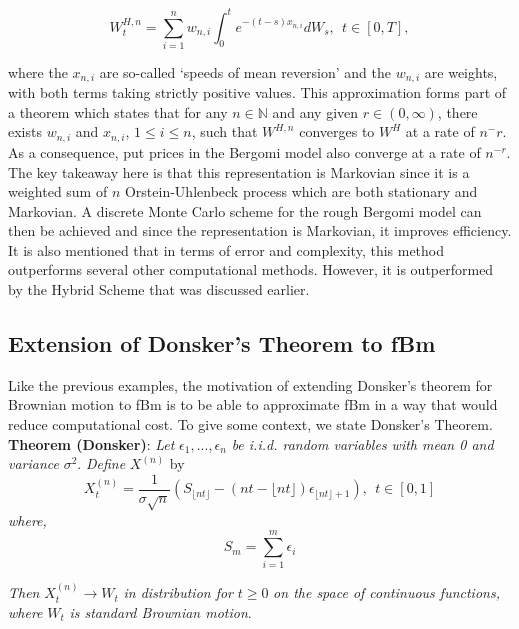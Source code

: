\documentclass[12pt,oneside]{article}
\begin{document}
\begin{equation}
\label{eqn:markov_approx}
W_t^{H,n} = \sum_{i=1}^n w_{n,i} \int_0^t e^{-(t-s)x_{n,i}}dW_s, \ \ t \in [0,T], 
\end{equation}

where the $x_{n,i}$ are so-called `speeds of mean reversion' and the $w_{n,i}$ are weights, with both terms taking strictly positive values. This approximation forms part of a theorem which states that for any $n\in\mathbb{N}$ and any given $r\in(0, \infty)$, there exists $w_{n,i}$ and $x_{n,i}$, $1\le i\le n$, such that $W^{H,n}$ converges to $W^H$ at a rate of $n^-{r}$. As a consequence, put prices in the Bergomi model also converge at a rate of $n^{-r}$. 
\\

The key takeaway here is that this representation is Markovian since it is a weighted sum of $n$ Orstein-Uhlenbeck process which are both stationary and Markovian. A discrete Monte Carlo scheme for the rough Bergomi model can then be achieved and since the representation is Markovian, it improves efficiency. It is also mentioned that in terms of error and complexity, this method outperforms several other computational methods. However, it is outperformed by the Hybrid Scheme that was discussed earlier. 

\subsection{Extension of Donsker's Theorem to fBm}
Like the previous examples, the motivation of extending Donsker's theorem for Brownian motion to fBm is to be able to approximate fBm in a way that would reduce computational cost. To give some context, we state Donsker's Theorem.
\\

 \noindent\textbf{Theorem (Donsker)}: \emph{Let} $\epsilon_1,...,\epsilon_n$ \emph{be i.i.d. random variables with mean 0 and variance} $\sigma^2$. \emph{Define} $X^{(n)}$ {by}
 \begin{equation}
 \label{eq:donsker_thm}
 X_t^{(n)} = \frac{1}{\sigma \sqrt{n}} (S_{\lfloor nt \rfloor} - (nt - \lfloor nt \rfloor) \epsilon_{\lfloor nt \rfloor + 1}), \ \ t\in[0,1]
 \end{equation}
 \emph{where,}
\begin{equation}
S_m = \sum_{i=1}^m \epsilon_i
\end{equation}

\emph{Then} $X_t^{(n)} \rightarrow W_t$ \emph{in distribution for} $t\ge0$ \emph{on the space of continuous functions, where} $W_t$ \emph{is standard Brownian motion}.
\\
\end{document}
